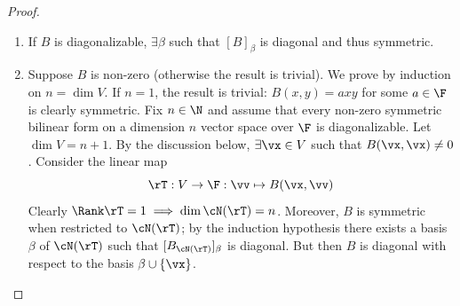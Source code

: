 \begin{proof}
\begin{enumerate}
  \item If $B$ is diagonalizable, $\exists\beta$ such that $[B]_\beta$ is diagonal and thus symmetric.
  \item Suppose $B$ is non-zero (otherwise the result is trivial). We prove by induction on $n=\dim V$.\smallbreak
  If $n=1$, the result is trivial: $B(x,y)=axy$ for some $a\in \F$ is clearly symmetric.\smallbreak
	Fix $n\in\N$ and assume that every non-zero symmetric bilinear form on a dimension $n$ vector space over $\F$ is diagonalizable. Let $\dim V=n+1$. By the discussion below, $\exists \vx\in V$ such that $B(\vx,\vx)\neq 0$. Consider the linear map
\[\rT:V\to\F:\vv\mapsto B(\vx,\vv)\]
Clearly $\Rank\rT=1\implies \dim\cN(\rT)=n$. Moreover, $B$ is symmetric when restricted to $\cN(\rT)$; by the induction hypothesis there exists a basis $\beta$ of $\cN(\rT)$ such that $[\at{B}{\cN(\rT)}]_\beta$ is diagonal. But then $B$ is diagonal with respect to the basis $\beta\cup\{\vx\}$.\qedhere 
\end{enumerate}
\end{proof}



